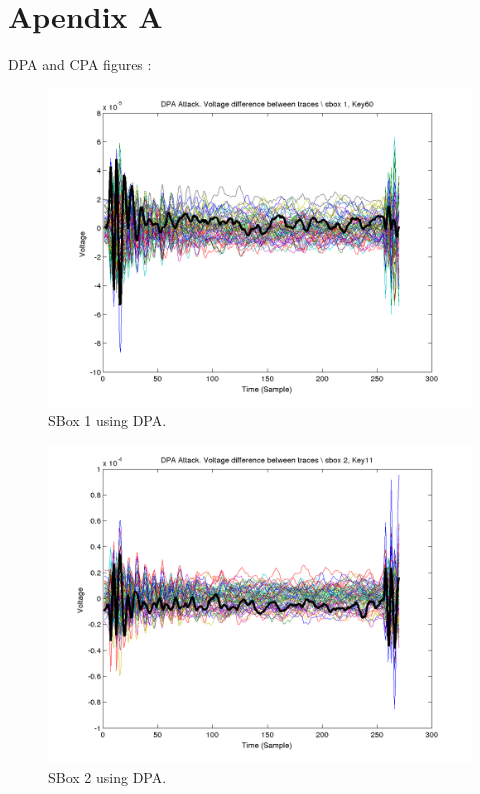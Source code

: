 \section{Apendix A}
DPA and CPA figures :  
  \begin{figure}[]
  \includegraphics[width=0.9\linewidth]{./dpa1}
  \caption{SBox 1 using DPA.} 
  \label{fig:dpa1}
  \end{figure}
  
  \begin{figure}[]
  \includegraphics[width=0.9\linewidth]{./dpa2}
  \caption{SBox 2 using DPA.}
  \label{fig:dpa2}
  \end{figure}
  
